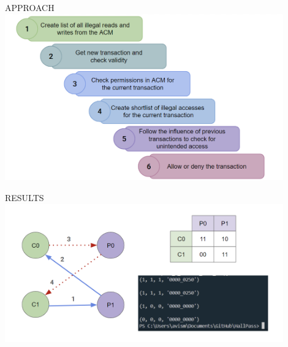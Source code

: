 \begin{frame}{APPROACH}
    \centering
    \includegraphics[height=0.85\textheight,width=0.9\textwidth,keepaspectratio]{steps.png}
\end{frame}

\begin{frame}{RESULTS}
    \centering
    \includegraphics[height=0.8\textheight,width=0.9\textwidth,keepaspectratio]{results.png}
\end{frame}